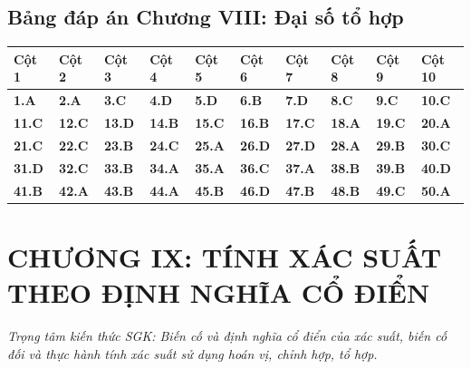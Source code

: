 \documentclass[11pt,a4paper]{article}
\begin{document}
\subsection*{\color{primary} Bảng đáp án Chương VIII: Đại số tổ hợp}
\begin{center}
\renewcommand{\arraystretch}{1.25}
\begin{tabularx}{\textwidth}{*{10}{>{\centering\arraybackslash}X}}
\toprule
\textbf{\color{primary} Cột 1} & \textbf{\color{primary} Cột 2} & \textbf{\color{primary} Cột 3} & \textbf{\color{primary} Cột 4} & \textbf{\color{primary} Cột 5} & \textbf{\color{primary} Cột 6} & \textbf{\color{primary} Cột 7} & \textbf{\color{primary} Cột 8} & \textbf{\color{primary} Cột 9} & \textbf{\color{primary} Cột 10} \\
\midrule
\textbf{1.A} & \textbf{2.A} & \textbf{3.C} & \textbf{4.D} & \textbf{5.D} & \textbf{6.B} & \textbf{7.D} & \textbf{8.C} & \textbf{9.C} & \textbf{10.C} \\
\rowcolor{rowtint} \textbf{11.C} & \textbf{12.C} & \textbf{13.D} & \textbf{14.B} & \textbf{15.C} & \textbf{16.B} & \textbf{17.C} & \textbf{18.A} & \textbf{19.C} & \textbf{20.A} \\
\textbf{21.C} & \textbf{22.C} & \textbf{23.B} & \textbf{24.C} & \textbf{25.A} & \textbf{26.D} & \textbf{27.D} & \textbf{28.A} & \textbf{29.B} & \textbf{30.C} \\
\rowcolor{rowtint} \textbf{31.D} & \textbf{32.C} & \textbf{33.B} & \textbf{34.A} & \textbf{35.A} & \textbf{36.C} & \textbf{37.A} & \textbf{38.B} & \textbf{39.B} & \textbf{40.D} \\
\textbf{41.B} & \textbf{42.A} & \textbf{43.B} & \textbf{44.A} & \textbf{45.B} & \textbf{46.D} & \textbf{47.B} & \textbf{48.B} & \textbf{49.C} & \textbf{50.A} \\
\bottomrule
\end{tabularx}
\end{center}\vspace{10pt}
\section*{\color{primary} CHƯƠNG IX: TÍNH XÁC SUẤT THEO ĐỊNH NGHĨA CỔ ĐIỂN}
\textit{Trọng tâm kiến thức SGK: Biến cố và định nghĩa cổ điển của xác suất, biến cố đối và thực hành tính xác suất sử dụng hoán vị, chỉnh hợp, tổ hợp.}\par\vspace{4pt}
\end{document}
